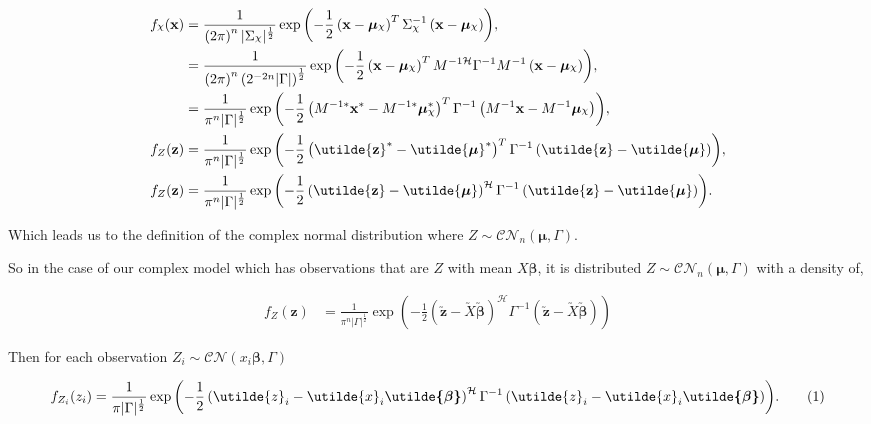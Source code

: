 \documentclass[honours,12pt]{unswthesis}
\newcommand{\augb}{\bm{\utilde{\beta}}}
\newcommand{\ct}{\mathcal{H}}
\DeclareRobustCommand{\Chi}{{\mathpalette\irchi\relax}}
\newcommand{\irchi}[2]{\raisebox{\depth}{$#1\chi$}} %
\newcommand\numberthis{\addtocounter{equation}{1}\tag{\theequation}}
\numberwithin{equation}{section}
\begin{document}
\begin{align*}
	f_{\Chi} ( \mathbf{x} ) &= \frac{1}{ \left( 2 \pi \right)^{n} | \Sigma_{\Chi} |^{\frac{1}{2}}} \exp{ \left( -\frac{1}{2} \left( \mathbf{x} - \bm{\mu}_{\Chi} \right)^{T} \Sigma_{\Chi}^{-1} \left( \mathbf{x} - \bm{\mu}_{\Chi} \right) \right) },\\
	&= \frac{1}{\left( 2 \pi \right)^{n} \left( 2^{- 2 n } |\Gamma| \right)^{ \frac{1}{2} } } \exp{ \left( -\frac{1}{2} \left( \mathbf{x} - \bm{\mu}_{\Chi} \right)^{T} M^{-1 \ct} \Gamma^{-1} M^{-1} \left( \mathbf{x} - \bm{\mu}_{\Chi} \right) \right) },\\
	&= \frac{1}{\pi^{n}|\Gamma|^{ \frac{1}{2} } } \exp{ \left( -\frac{1}{2} \left( M^{-1 * } \mathbf{x}^{*} - M^{-1 * } \bm{\mu}_{\Chi}^{*} \right)^{T} \Gamma^{-1} \left( M^{-1} \mathbf{x} - M^{-1} \bm{\mu}_{\Chi} \right) \right) },\\
	f_{Z} ( \mathbf{z} ) &= \frac{1}{\pi^{n}|\Gamma|^{ \frac{1}{2} } } \exp{ \left( -\frac{1}{2} \left( \utilde{\mathbf{z}}^{*} - \utilde{\bm{\mu}}^{*} \right)^{T} \Gamma^{-1} \left( \utilde{\mathbf{z}} - \utilde{\bm{\mu}} \right) \right) },\\
	f_{Z} ( \mathbf{z} ) &= \frac{1}{\pi^{n}|\Gamma|^{ \frac{1}{2} } } \exp{ \left( -\frac{1}{2} \left( \utilde{\mathbf{z}} - \utilde{\bm{\mu}} \right)^{\ct} \Gamma^{-1} \left( \utilde{\mathbf{z}} - \utilde{\bm{\mu}} \right) \right) }.
\end{align*}

\noindent Which leads us to the definition of the complex normal distribution where $Z \sim \mathcal{CN}_{n} \left( \bm{\mu}, \Gamma \right)$. \par
So in the case of our complex model which has observations that are $Z$ with mean $X \bm{\beta}$, it is distributed $Z \sim \mathcal{CN}_{n} \left( \bm{\mu}, \Gamma \right)$ with a density of,

\begin{align*}
	f_{Z} ( \mathbf{z} ) &= \frac{1}{\pi^{n}|\Gamma|^{ \frac{1}{2} } } \exp{ \left( -\frac{1}{2} \left( \utilde{\mathbf{z}} - \utilde{X} \utilde{\bm{\beta}} \right)^{\ct} \Gamma^{-1} \left( \utilde{\mathbf{z}} - \utilde{X} \utilde{\bm{\beta}} \right) \right) }
\end{align*}

\noindent Then for each observation $Z_{i} \sim \mathcal{CN} \left( x_{i} \bm{\beta}, \Gamma \right)$

\begin{align*}
f_{Z_{i}} (z_{i}) = \frac{1}{\pi |\Gamma|^{\frac{1}{2}}} \exp{ \left( - \frac{1}{2} \left( \utilde{z}_{i} - \utilde{x}_{i} \augb \right)^{\ct} \Gamma^{-1} \left( \utilde{z}_{i} - \utilde{x}_{i} \augb \right) \right)}. \numberthis \label{modeldistribution}
\end{align*}
\end{document}

